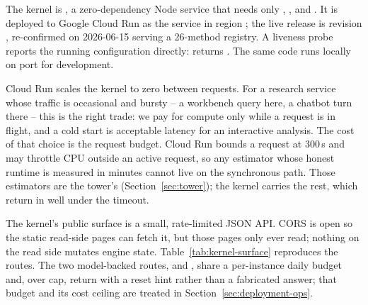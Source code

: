 The kernel is , a zero-dependency Node service that
needs only , ,  and
. It is deployed to Google Cloud Run as the service
 in region ; the live release is revision
, re-confirmed on 2026-06-15 serving a 26-method
registry. A liveness probe reports the running configuration directly:
 returns
. The same code runs locally on port
 for development.

Cloud Run scales the kernel to zero between requests. For a research service whose
traffic is occasional and bursty -- a workbench query here, a chatbot turn there --
this is the right trade: we pay for compute only while a request is in flight, and
a cold start is acceptable latency for an interactive analysis. The cost of that
choice is the request budget. Cloud Run bounds a request at 300\,s and may throttle
CPU outside an active request, so any estimator whose honest runtime is measured in
minutes cannot live on the synchronous path. Those estimators are the tower's
(Section~\ref{sec:tower}); the kernel carries the rest, which return in well under
the timeout.

The kernel's public surface is a small, rate-limited JSON API. CORS is open so the
static read-side pages can fetch it, but those pages only ever read; nothing on the
read side mutates engine state. Table~\ref{tab:kernel-surface} reproduces the
routes. The two model-backed routes,  and ,
share a per-instance daily budget and, over cap, return 
with a reset hint rather than a fabricated answer; that budget and its cost ceiling
are treated in Section~\ref{sec:deployment-ops}.

